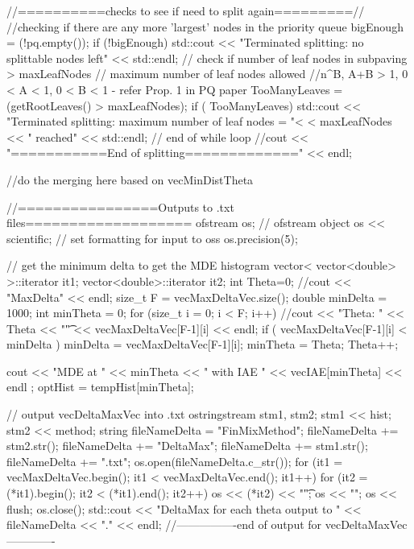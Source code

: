 \begin{DoxyCode}
{{{        //==========checks to see if need to split again=========//
            //checking if there are any more 'largest' nodes in the priority
       queue
            bigEnough = (!pq.empty());
            if (!bigEnough){    
          std::cout << "Terminated splitting: no splittable nodes left"
                    << std::endl;
            }
        // check if number of leaf nodes in subpaving > maxLeafNodes
        // maximum number of leaf nodes allowed
        //n^B, A+B > 1, 0  < A < 1, 0 < B < 1 - refer Prop. 1 in PQ paper
        TooManyLeaves = (getRootLeaves() > maxLeafNodes);
        if ( TooManyLeaves) {
          std::cout << "Terminated splitting: maximum number of leaf nodes = "<
      < maxLeafNodes << " reached"
                          << std::endl;
        }
      } // end of while loop
      //cout << "===========End of splitting=============" << endl;
        
      //do the merging here based on vecMinDistTheta
         
      //================Outputs to .txt files=================== 
      ofstream os;         // ofstream object
      os << scientific;  // set formatting for input to oss
      os.precision(5);

       // get the minimum delta to get the MDE histogram
      vector< vector<double> >::iterator it1; 
      vector<double>::iterator it2;
      int Theta=0;
      //cout << "MaxDelta" << endl;
      size_t F = vecMaxDeltaVec.size(); 
      double minDelta = 1000;
      int minTheta = 0;
      for (size_t i = 0; i < F; i++){
        //cout << "Theta: " << Theta << "\t" << vecMaxDeltaVec[F-1][i] << endl;
        if ( vecMaxDeltaVec[F-1][i] < minDelta ) { 
          minDelta = vecMaxDeltaVec[F-1][i]; 
          minTheta = Theta; 
        } 
        Theta++;
      }

      cout << "MDE at " << minTheta << " with IAE " << vecIAE[minTheta] << endl
      ; 
         optHist = tempHist[minTheta];

      // output vecDeltaMaxVec into .txt 
      ostringstream stm1, stm2;
      stm1 << hist;
      stm2 << method;
      string fileNameDelta = "FinMixMethod";
      fileNameDelta += stm2.str();
      fileNameDelta += "DeltaMax";
      fileNameDelta += stm1.str();
      fileNameDelta += ".txt";  
      os.open(fileNameDelta.c_str());
      for (it1 = vecMaxDeltaVec.begin(); it1 < vecMaxDeltaVec.end(); it1++){ 
        for (it2 = (*it1).begin(); it2 < (*it1).end(); it2++){
          os << (*it2) << "\t";
        }
        os << "\n";
      }          
      os << flush;
      os.close();
      std::cout << "DeltaMax for each theta output to " << fileNameDelta << "."
       << endl;
      //----------------end of output for vecDeltaMaxVec-------------
 
}}
\end{DoxyCode}
